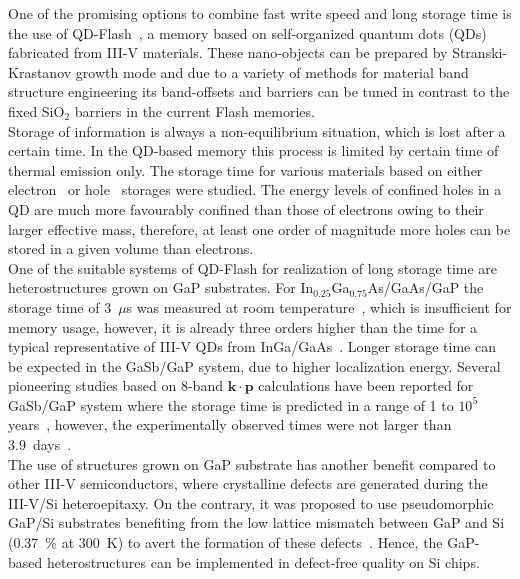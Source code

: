 One of the promising options to combine fast write speed and long storage time is the use of QD-Flash~\citep{Geller_APL2008_QDFlash}, a memory based on self-organized quantum dots (QDs) fabricated from III-V materials. These nano-objects can be prepared by Stranski-Krastanov growth mode and due to a variety of methods for material band structure engineering its band-offsets and barriers can be tuned in contrast to the fixed SiO$_2$ barriers in the current Flash memories.\\
%
\indent Storage of information is always a non-equilibrium situation, which is lost after a certain time. In the QD-based memory this process is limited by certain time of thermal emission only. The storage time for various materials based on either electron~\citep{Anand_apl1995_elflash,Nowozin_2013_sum} or hole~\citep{GellerPRB, stracke_apl2012_qdflash_GaP,Nowozin_2013_sum} storages were studied. The energy levels of confined holes in a QD are much more favourably confined than those of electrons owing to their larger effective mass, therefore, at least one order of magnitude more holes can be stored in a given volume than electrons. \\
%
\indent One of the suitable systems of QD-Flash for realization of long storage time are heterostructures grown on GaP substrates. For In$_{0.25}$Ga$_{0.75}$As/GaAs/GaP the storage time of 3~$\mu$s was measured at room temperature~\citep{stracke_apl2012_qdflash_GaP}, which is insufficient for memory usage, however, it is already three orders higher than the time for a typical representative of III-V QDs from InGa/GaAs~\citep{GellerPRB}. Longer storage time can be expected in the GaSb/GaP system, due to higher localization energy. Several pioneering studies based on 8-band $\mathbf{k\cdot p}$ calculations have been reported for GaSb/GaP system where the storage time is predicted in a range of 1 to $10^5$ years~\citep{Bimberg_proceedingSPIE}, however, the experimentally observed times were not larger than 3.9~days~\citep{Bonato_pssolidi_GaSbonGaP}.\\%
%
\indent The use of structures grown on GaP substrate has another benefit compared to other III-V semiconductors, where crystalline defects are generated during the III-V/Si heteroepitaxy. On the contrary, it was proposed to use pseudomorphic GaP/Si substrates benefiting from the low lattice mismatch between GaP and Si (0.37~\% at 300~K) to avert the formation of these defects~\citep{Beyer_jap2013,Grassman_apl2013, Lin_jcg2013}. Hence, the GaP-based heterostructures can be implemented in defect-free quality on Si chips.

